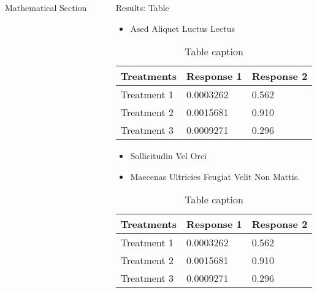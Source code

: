 \documentclass[final,hyperref={pdfpagelabels=false}]{beamer}
\begin{document}
\begin{frame}[t]
\begin{columns}[t]
\begin{column}{.32\textwidth}
\begin{block}{Mathematical Section}
  \end{block}


\end{column}
\begin{column}{.01\textwidth}\end{column} %
\begin{column}{.32\textwidth} %


  \begin{block}{Results: Table}

    \begin{itemize}
    \item Ased Aliquet Luctus Lectus
    \end{itemize}

    \begin{table}
      \begin{tabular}{l l l}
        \toprule
        \textbf{Treatments} & \textbf{Response 1} & \textbf{Response 2}\\
        \midrule
        Treatment 1 & 0.0003262 & 0.562 \\
        Treatment 2 & 0.0015681 & 0.910 \\
        Treatment 3 & 0.0009271 & 0.296 \\
        \bottomrule
      \end{tabular}
      \caption{Table caption}
    \end{table}

    \begin{itemize}
    \item Sollicitudin Vel Orci
    \item Maecenas Ultricies Feugiat Velit Non Mattis.
    \end{itemize}

    \begin{table}
      \begin{tabular}{l l l}
        \toprule
        \textbf{Treatments} & \textbf{Response 1} & \textbf{Response 2}\\
        \midrule
        Treatment 1 & 0.0003262 & 0.562 \\
        Treatment 2 & 0.0015681 & 0.910 \\
        Treatment 3 & 0.0009271 & 0.296 \\
        \bottomrule
      \end{tabular}
      \caption{Table caption}
    \end{table}
     

\end{block}
\end{column}
\end{columns}
\end{frame}
\end{document}

